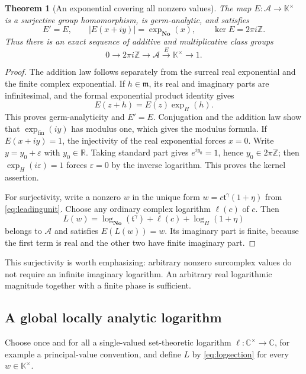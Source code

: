 \documentclass[11pt,a4paper]{article}
\numberwithin{equation}{section}
\newtheorem{theorem}{Theorem}[section]
\theoremstyle{definition}
\newcommand{\No}{\mathbf{No}}
\newcommand{\K}{\mathbb K}
\newcommand{\C}{\mathbb C}
\newcommand{\R}{\mathbb R}
\newcommand{\Z}{\mathbb Z}
\newcommand{\tmon}{\mathfrak t}
\newcommand{\mm}{\mathfrak m}
\newcommand{\fin}{\mathrm{fin}}
\begin{document}
\begin{theorem}[An exponential covering all nonzero values]\label{thm:strip-exp}
The map $E:\mathcal A\to\K^\times$ is a surjective group homomorphism,
is germ-analytic, and satisfies
\[
 E'=E,\qquad |E(x+iy)|=\exp_{\No}(x),\qquad
 \ker E=2\pi i\Z.
\]
Thus there is an exact sequence of additive and multiplicative class groups
\[
 0\longrightarrow2\pi i\Z\longrightarrow\mathcal A
       \xrightarrow{\ E\ }\K^\times\longrightarrow1.
\]
\end{theorem}
\begin{proof}
The addition law follows separately from the surreal real exponential and
the finite complex exponential. If $h\in\mm$, its real and imaginary parts
are infinitesimal, and the formal exponential product identity gives
\begin{equation}\label{eq:exp-local}
 E(z+h)=E(z)\exp_H(h).
\end{equation}
This proves germ-analyticity and $E'=E$.
Conjugation and the addition law show that $\exp_{\fin}(iy)$ has modulus one,
which gives the modulus formula. If $E(x+iy)=1$, the injectivity of the real
exponential forces $x=0$. Write $y=y_0+\varepsilon$ with $y_0\in\R$.
Taking standard part gives $e^{iy_0}=1$, hence $y_0\in2\pi\Z$; then
$\exp_H(i\varepsilon)=1$ forces $\varepsilon=0$ by the inverse logarithm.
This proves the kernel assertion.

For surjectivity, write a nonzero $w$ in the unique form
$w=c\tmon^\gamma(1+\eta)$ from \eqref{eq:leadingunit}. Choose any ordinary
complex logarithm $\ell(c)$ of $c$. Then
\begin{equation}\label{eq:logsection}
 L(w)=\log_{\No}(\tmon^\gamma)+\ell(c)+\log_H(1+\eta)
\end{equation}
belongs to $\mathcal A$ and satisfies $E(L(w))=w$. Its imaginary part is finite,
because the first term is real and the other two have finite imaginary part.
\end{proof}

This surjectivity is worth emphasizing: arbitrary nonzero surcomplex values
do not require an infinite imaginary logarithm. An arbitrary real logarithmic
magnitude together with a finite phase is sufficient.

\subsection{A global locally analytic logarithm}

Choose once and for all a single-valued set-theoretic logarithm
$\ell:\C^\times\to\C$, for example a principal-value convention, and define
$L$ by \eqref{eq:logsection} for every $w\in\K^\times$.
\end{document}
